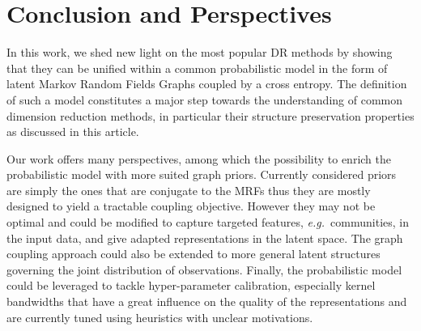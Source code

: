 \section{Conclusion and Perspectives}\label{Perspectives}

In this work, we shed new light on the most popular DR methods by showing that they can be unified within a common probabilistic model in the form of latent Markov Random Fields Graphs coupled by a cross entropy. The definition of such a model constitutes a major step towards the understanding of common dimension reduction methods, in particular their structure preservation properties as discussed in this article. 

Our work offers many perspectives, among which the possibility to enrich the probabilistic model with more suited graph priors. Currently considered priors are simply the ones that are conjugate to the MRFs thus they are mostly designed to yield a tractable coupling objective. However they may not be optimal and could be modified to capture targeted features, \textit{e.g.}\ communities, in the input data, and give adapted representations in the latent space. The graph coupling approach could also be extended to more general latent structures governing the joint distribution of observations.
Finally, the probabilistic model could be leveraged to tackle hyper-parameter calibration, especially kernel bandwidths that have a great influence on the quality of the representations and are currently tuned using heuristics with unclear motivations.